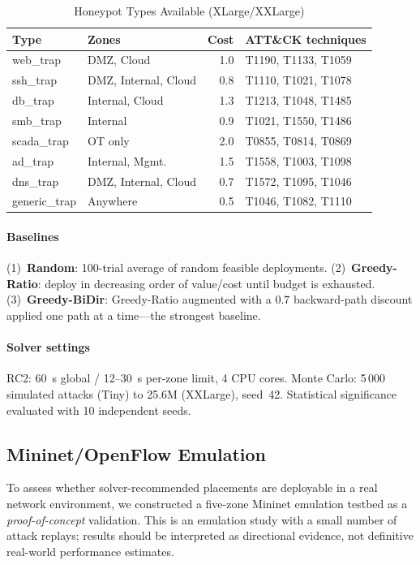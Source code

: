 \documentclass[journal]{IEEEtran}
\begin{document}
\begin{table}[t]
\caption{Honeypot Types Available (XLarge/XXLarge)}
\label{tab:hptypes}
\centering
\renewcommand{\arraystretch}{1.2}
\begin{tabular}{llrl}
\toprule
Type & Zones & Cost & ATT\&CK techniques \\
\midrule
web\_trap    & DMZ, Cloud           & 1.0 & T1190, T1133, T1059 \\
ssh\_trap    & DMZ, Internal, Cloud & 0.8 & T1110, T1021, T1078 \\
db\_trap     & Internal, Cloud      & 1.3 & T1213, T1048, T1485 \\
smb\_trap    & Internal             & 0.9 & T1021, T1550, T1486 \\
scada\_trap  & OT only              & 2.0 & T0855, T0814, T0869 \\
ad\_trap     & Internal, Mgmt.      & 1.5 & T1558, T1003, T1098 \\
dns\_trap    & DMZ, Internal, Cloud & 0.7 & T1572, T1095, T1046 \\
generic\_trap& Anywhere             & 0.5 & T1046, T1082, T1110 \\
\bottomrule
\end{tabular}
\end{table}

\paragraph{Baselines}
(1)~\textbf{Random}: 100-trial average of random feasible deployments.
(2)~\textbf{Greedy-Ratio}: deploy in decreasing order of value/cost
until budget is exhausted.
(3)~\textbf{Greedy-BiDir}: Greedy-Ratio augmented with a $0.7$
backward-path discount applied one path at a time---the strongest
baseline.

\paragraph{Solver settings}
RC2: 60~s global / 12--30~s per-zone limit, 4 CPU cores.
Monte Carlo: 5\,000 simulated attacks (Tiny) to 25.6M (XXLarge),
seed~42. Statistical significance evaluated with 10 independent seeds.

\subsection{Mininet/OpenFlow Emulation}
\label{sec:emulation}

To assess whether solver-recommended placements are deployable in a
real network environment, we constructed a five-zone Mininet emulation
testbed as a \emph{proof-of-concept} validation. This is an emulation
study with a small number of attack replays; results should be
interpreted as directional evidence, not definitive real-world
performance estimates.
\end{document}
